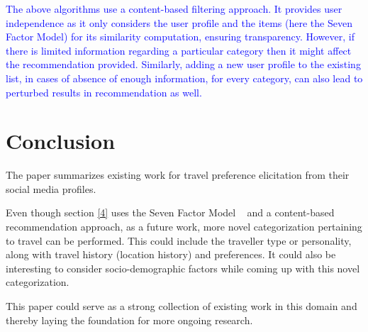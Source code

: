 \textcolor{blue}{The above algorithms use a content-based filtering approach. It provides user independence as it only considers the user profile and the items (here the Seven Factor Model) for its similarity computation, ensuring transparency. However, if there is limited information regarding a particular category then it might affect the recommendation provided. Similarly, adding a new user profile to the existing list, in cases of absence of enough information, for every category, can also lead to perturbed results in recommendation as well.}



\section{Conclusion}
The paper summarizes existing work for travel preference elicitation from their social media profiles. 

Even though section \ref{4} uses the Seven Factor Model ~\cite{sertkan2018mapping} and a content-based recommendation approach, as a future work, more novel categorization pertaining to travel can be performed. This could include the traveller type or personality, along with travel history (location history) and preferences. It could also be interesting to consider socio-demographic factors while coming up with this novel categorization.

This paper could serve as a strong collection of existing work in this domain and thereby laying the foundation for more ongoing research.

